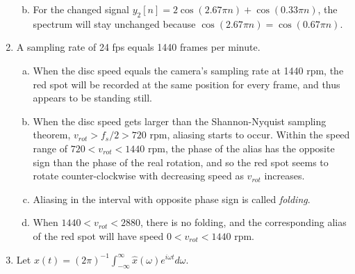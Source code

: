 \begin{enumerate}
\begin{enumerate}[a)]
\begin{marginfigure}
\begin{center}
		  \end{center}
		\end{marginfigure}
    
    \item For the changed signal $y_2[n] = 2 \cos(2.67 \pi n) + \cos(0.33 \pi n)$, the spectrum will stay unchanged because $\cos(2.67 \pi n) = \cos(0.67 \pi n)$.
  \end{enumerate}
  
\item A sampling rate of 24 fps equals 1440 frames per minute.
\begin{enumerate}[a)]
    \item When the disc speed equals the camera's sampling rate at 1440 rpm, the red spot will be recorded at the same position for every frame, and thus appears to be standing still.
    \item When the disc speed gets larger than the Shannon-Nyquist sampling theorem, $v_{rot} > f_s / 2 > 720$ rpm, aliasing starts to occur. Within the speed range of $720 < v_{rot} < 1440$ rpm, the phase of the alias has the opposite sign than the phase of the real rotation, and so the red spot seems to rotate counter-clockwise with decreasing speed as $v_{rot}$ increases.
    \item Aliasing in the interval with opposite phase sign is called \emph{folding}.
    \item When $1440 < v_{rot} < 2880$, there is no folding, and the corresponding alias of the red spot will have speed $0 < v_{rot} < 1440$ rpm.
\end{enumerate}

\item Let $x(t)=(2\pi)^{-1}\int_{-\infty}^{\infty}\hat{x}(\omega)e^{i\omega t}d\omega$.


\end{enumerate}
